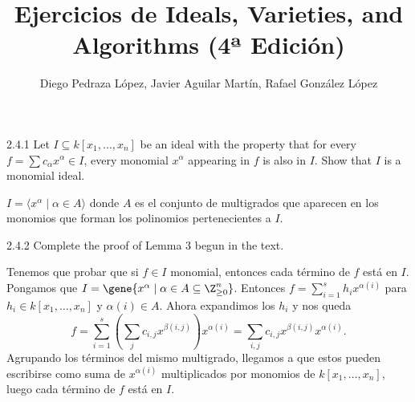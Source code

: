 \documentclass[twoside]{article}
\begin{document}
\title{Ejercicios de Ideals, Varieties, and Algorithms (4ª Edición)}
\author{Diego Pedraza López, Javier Aguilar Martín, Rafael González López}
\maketitle

\begin{ejercicio}{2.4.1}
Let $I ⊆ k[x_1,\dots , x_n]$ be an ideal with the property that for every $f =\sum
c_{α} x^{α} ∈ I$, every
monomial $x^α$ appearing in $f$ is also in $I$. Show that $I$ is a monomial ideal.
\end{ejercicio}
\begin{solucion}
$I=\langle x^\alpha\mid\alpha\in A\rangle$ donde $A$ es el conjunto de multigrados que aparecen en los monomios que forman los polinomios pertenecientes a $I$. 
\end{solucion}
\newpage

\begin{ejercicio}{2.4.2}
Complete the proof of Lemma 3 begun in the text.
\end{ejercicio}
\begin{solucion}
Tenemos que probar que si $f\in I$ monomial, entonces cada término de $f$ está en $I$. Pongamos que $I=\gene{x^{\alpha} \mid \alpha\in A\subseteq\Z^n_{\geq 0}}$. Entonces $f=\sum_{i=1}^s h_ix^{\alpha(i)}$ para $h_i\in k[x_1,\dots, x_n]$ y $\alpha(i)\in A$. Ahora expandimos los $h_i$ y nos queda
\[
f=\sum_{i=1}^s\left(\sum_j c_{i,j}x^{\beta(i,j)}\right)x^{\alpha(i)}=\sum_{i,j} c_{i,j}x^{\beta(i,j)}x^{\alpha(i)}.
\]
Agrupando los términos del mismo multigrado, llegamos a que estos pueden escribirse como suma de $x^{\alpha(i)}$ multiplicados por monomios de $k[x_1,\dotsc,x_n]$, luego cada término de $f$ está en $I$.
\end{solucion}
\newpage
\end{document}
